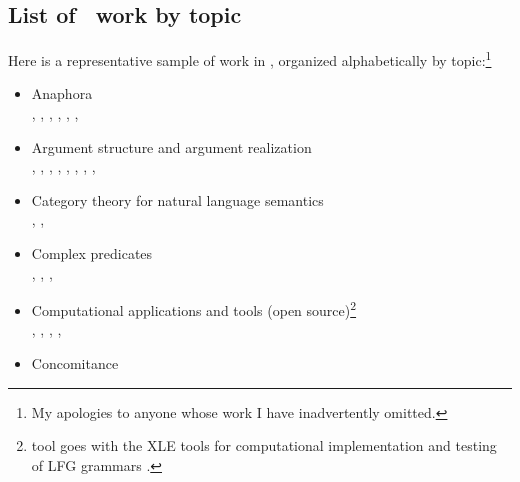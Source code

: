 \documentclass[output=paper,hidelinks]{langscibook}
\begin{document}
\begin{paperappendix}


\section*{List of \glue\ work by topic}

Here is a representative sample of work in \glues, organized
alphabetically by topic:\footnote{My apologies to anyone whose work I
  have inadvertently omitted.}

\begin{itemize}%
\item Anaphora\\ 
  \citet{dalrymple;ea97b}, \citet{Asudeh2004,Asudeh05reln,Asudeh12},
  \citet{bary;haug11}, \citet{Belyaev14}, 
    \citet[ch.\,14]{DLM:LFG}, \citet{Haug2020-is}, \citet{dalrymple;haug22}
  
\item 
  Argument structure and argument realization\\
  \citet{AsudGior12}, \citet{asudeh2014meaning},
  \citet{asudeh:unrealized}, \citet{arnold;sadler12},
  \citet{findlay14-mphil,findlay2017mapping,Findlay2020},
  \citet{Lowe2015,lowe19-cp}, \citet{lowe;birahimani19},
  \citet{Przep17a}, \citet{Lovestrand2020}
  
\item Category theory for natural language semantics\\
  \citet{giorgolo;asudeh12b,GiorAsud12}, \citet{giorgolo;asudeh14-eacl,giorgolo;asudeh14-cogsci},
    \citet{asudeh;giorgolo-perspectives,asudeh;giorgolo20}
  
\item 
  Complex predicates\\
  \citet{andrews07-cp,Andrews2018shs}, \citet{Lowe2015,lowe19-cp},
  \citet{lowe;birahimani19}, \citet{Lovestrand2020}
  
\item Computational applications and tools (open source)\footnote{ tool goes with the XLE
    tools for computational implementation and testing of LFG grammars
    \citep*{xledoc}.}\\
  \citet{crouch;ea01}, \citet{lev:packed-computation}, \citet{messmerzylma18}, 
  \citet{dal:pat:zym:20}, 
  \citet{zymla-asaw,zymla-glue-workbench,zymla-xle-glue} 

\item Concomitance\\ \citet{Haug09}


\end{itemize}
\end{paperappendix}
\end{document}
